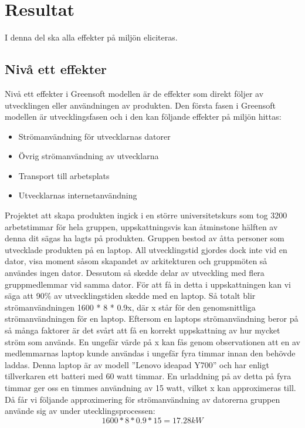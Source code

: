 \section{Resultat}
\label{sec:joel_a-results}
I denna del ska alla effekter på miljön eliciteras. 
\subsection{Nivå ett effekter}
Nivå ett effekter i Greensoft modellen är de effekter som direkt följer av utvecklingen eller användningen av produkten. Den första fasen i Greensoft modellen är utvecklingsfasen och i den kan följande effekter på miljön hittas:
\begin{itemize}
	\item Strömanvändning för utvecklarnas datorer
	\item Övrig strömanvändning av utvecklarna
	\item Transport till arbetsplats
	\item Utvecklarnas internetanvändning
\end{itemize}

Projektet att skapa produkten ingick i en större universitetskurs som tog 3200 arbetstimmar för hela gruppen, uppskattningsvis kan åtminstone hälften av denna dit sägas ha lagts på produkten. Gruppen bestod av åtta personer som utvecklade produkten på en laptop. All utvecklingstid gjordes dock inte vid en dator, visa moment såsom skapandet av arkitekturen och gruppmöten så användes ingen dator. Dessutom så skedde delar av utveckling med flera gruppmedlemmar vid samma dator. För att få in detta i uppskattningen kan vi säga att 90\% av utvecklingstiden skedde med en laptop. Så totalt blir strömanvändningen 1600 * 8 * 0.9x, där x står för den genomsnittliga strömanvändningen för en laptop. Eftersom en laptops strömanvändning beror på så många faktorer är det svårt att få en korrekt uppskattning av hur mycket ström som används. En ungefär värde på x kan fås genom observationen att en av medlemmarnas laptop kunde användas i ungefär fyra timmar innan den behövde laddas. Denna laptop är av modell ''Lenovo ideapad Y700'' och har enligt tillverkaren \cite{lenovo} ett batteri med 60 watt timmar. En urladdning på av detta på fyra timmar ger oss en timmes användning av 15 watt, vilket x kan approximeras till. Då får vi följande approximering för strömanvändning av datorerna gruppen använde sig av under utecklingsprocessen: $$1600 * 8 * 0.9 * 15 = 17.28kW$$

